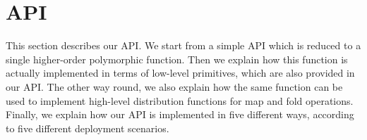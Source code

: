 \documentclass{llncs}
\newcommand{\Ocaml}{OCaml}
\newcommand{\JoCaml}{Jo{\&\!}Caml}
\begin{document}
\begin{comment}
Closest to the approach in this paper is Yohann Padioleau's MapReduce
implementation in \Ocaml~\cite{poor-man-mapreduce}.  It is built on
top of OCamlMPI~\cite{ocamlMPI}, while our approach uses a homemade
protocol for message passing.  Currently, we have less flexibility
w.r.t. deployment of the user program than OCamlMPI; on the other
hand, we provide a 
more generic API together with fault tolerance.  There are other
distributed computing libraries on top of which one could implement
the library discussed in this paper. \JoCaml~\cite{jocaml} is one of
them. However, \JoCaml\ does not provide fault tolerance, which is
indispensable in a distributed setting. The user has to include code
for fault tolerance, as already demonstrated in some \JoCaml\
experiments~\cite{mandel2008}. 

There are other implementations of distributed computing in the
context of functional programming. One is the Disco
project~\cite{disco}, which implements exactly Google's MapReduce in
Erlang~\cite{erlang}. Our library, on the contrary, is not an \Ocaml\
implementation of Google's MapReduce.
There are other ways to exploit multi-core architectures. One of these
is data parallelism, which is also relevant in the functional
programming setting~\cite{parallel-haskell}. Our work
does not target data parallelism at all.

\medskip
The paper is organized as follows. 
Section~\ref{sec:API} describes the API of our library.
Section~\ref{sec:implem} gives implementation details, focusing
on marshaling, network protocol and fault tolerance.
Then Section~\ref{sec:experiments} illustrates the
potential of the presented library through experimental evaluation. 
Finally, Section~\ref{sec:future} outlines some future work.

\end{comment}

\section{API}\label{sec:API}

This section describes our API. 
We start from a simple API which is reduced to a single higher-order
polymorphic function.
Then we explain how this function is actually implemented in terms of
low-level primitives, which are also provided in our API.
The other way round, we also explain how the same function can
be used to implement high-level distribution functions for map and
fold operations. Finally, we explain how our API is
implemented in five different ways, according to five different deployment
scenarios. 
\end{document}
